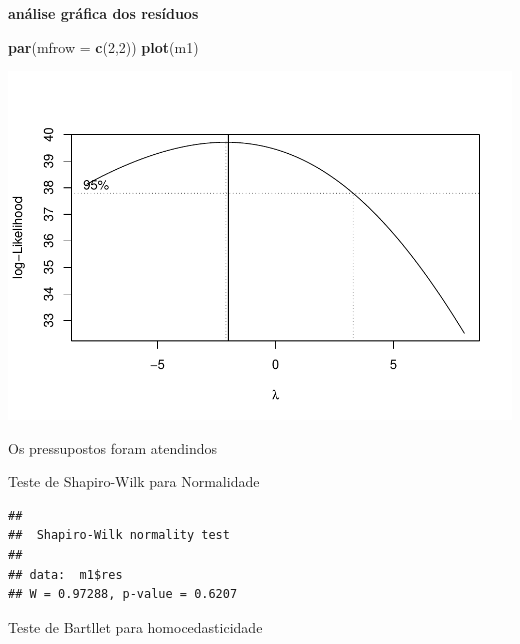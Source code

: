 \documentclass[
]{book}
\newenvironment{Shaded}{\begin{snugshade}}{\end{snugshade}}
\newcommand{\DataTypeTok}[1]{\textcolor[rgb]{0.13,0.29,0.53}{#1}}
\newcommand{\DecValTok}[1]{\textcolor[rgb]{0.00,0.00,0.81}{#1}}
\newcommand{\KeywordTok}[1]{\textcolor[rgb]{0.13,0.29,0.53}{\textbf{#1}}}
\newcommand{\NormalTok}[1]{#1}
\newcommand{\OperatorTok}[1]{\textcolor[rgb]{0.81,0.36,0.00}{\textbf{#1}}}
\begin{document}
\textbf{análise gráfica dos resíduos}

\begin{Shaded}
\begin{Highlighting}[]
\KeywordTok{par}\NormalTok{(}\DataTypeTok{mfrow =} \KeywordTok{c}\NormalTok{(}\DecValTok{2}\NormalTok{,}\DecValTok{2}\NormalTok{))}
\KeywordTok{plot}\NormalTok{(m1)}
\end{Highlighting}
\end{Shaded}

\includegraphics{TudodoR_files/figure-latex/unnamed-chunk-292-1.pdf}

Os pressupostos foram atendindos

Teste de Shapiro-Wilk para Normalidade

\begin{Shaded}
\end{Shaded}

\begin{verbatim}
## 
##  Shapiro-Wilk normality test
## 
## data:  m1$res
## W = 0.97288, p-value = 0.6207
\end{verbatim}

Teste de Bartllet para homocedasticidade

\begin{Shaded}
\end{Shaded}
\end{document}
